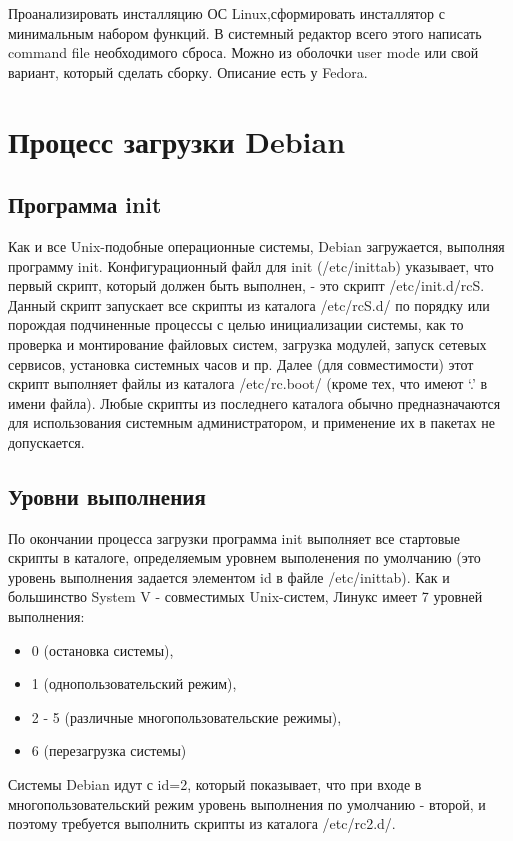 \documentclass[12pt,a4paper]{article}
\begin{document}
\newpage
\tableofcontents
\newpage
Проанализировать инсталляцию ОС Linux,сформировать инсталлятор с минимальным набором функций. В системный редактор всего этого написать command file необходимого сброса. Можно  из оболочки user mode или свой вариант, который сделать сборку. Описание есть у  Fedora.
\section{Процесс загрузки Debian}
\subsection{Программа init}
Как и все Unix-подобные операционные системы, Debian загружается, выполняя программу init. Конфигурационный файл для init (/etc/inittab) указывает, что первый скрипт, который должен быть выполнен, - это скрипт /etc/init.d/rcS. Данный скрипт запускает все скрипты из каталога /etc/rcS.d/ по порядку или порождая подчиненные процессы с целью инициализации системы, как то проверка и монтирование файловых систем, загрузка модулей, запуск сетевых сервисов, установка системных часов и пр. Далее (для совместимости) этот скрипт выполняет файлы из каталога /etc/rc.boot/ (кроме тех, что имеют `.' в имени файла). Любые скрипты из последнего каталога обычно предназначаются для использования системным администратором, и применение их в пакетах не допускается.
\subsection{Уровни выполнения}
По окончании процесса загрузки программа init выполняет все стартовые скрипты в каталоге, определяемым уровнем выполенения по умолчанию (это уровень выполнения задается элементом id в файле /etc/inittab). Как и большинство System V - совместимых Unix-систем, Линукс имеет 7 уровней выполнения:
\begin{itemize}
  \item 0 (остановка системы),
  \item 1 (однопользовательский режим),
  \item 2 - 5 (различные многопользовательские режимы),
  \item 6 (перезагрузка системы)
\end{itemize}
Системы Debian идут с id=2, который показывает, что при входе в многопользовательский режим уровень выполнения по умолчанию - второй, и поэтому требуется выполнить скрипты из каталога /etc/rc2.d/.
\end{document}
